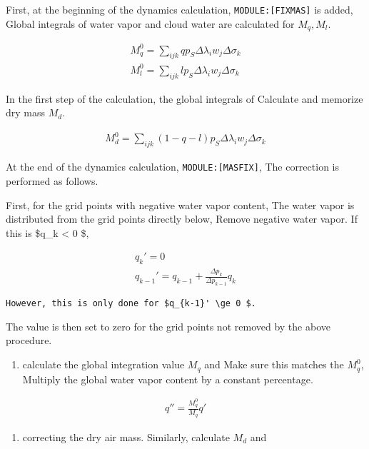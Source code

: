 First, at the beginning of the dynamics calculation,
\texttt{MODULE:{[}FIXMAS{]}} is added, Global integrals of water vapor
and cloud water are calculated for \(M_q, M_l\).

\begin{eqnarray}
  M_q^0  =  \sum_{ijk} q p_S  \Delta\lambda_i w_j \Delta\sigma_k  \\
  M_l^0  =  \sum_{ijk} l p_S  \Delta\lambda_i w_j \Delta\sigma_k 
\end{eqnarray}

In the first step of the calculation, the global integrals of Calculate
and memorize dry mass \(M_d\).

\begin{eqnarray}
  M_d^0 = \sum_{ijk} (1-q-l) p_S \Delta\lambda_i w_j \Delta\sigma_k 
\end{eqnarray}

At the end of the dynamics calculation, \texttt{MODULE:{[}MASFIX{]}},
The correction is performed as follows.

First, for the grid points with negative water vapor content, The water
vapor is distributed from the grid points directly below, Remove
negative water vapor. If this is \$q\_k \textless{} 0 \$,

\begin{eqnarray}
        q_k'      =  0          \\
        q_{k-1}'  =  q_{k-1} + \frac{\Delta p_k}{\Delta p_{k-1}} q_k
\end{eqnarray}

\begin{verbatim}
However, this is only done for $q_{k-1}' \ge 0 $.
\end{verbatim}

The value is then set to zero for the grid points not removed by the
above procedure.

\begin{enumerate}
\def\labelenumi{\arabic{enumi}.}
\setcounter{enumi}{2}
\tightlist
\item
  calculate the global integration value \(M_q\) and Make sure this
  matches the \(M_q^0\), Multiply the global water vapor content by a
  constant percentage.
\end{enumerate}

\begin{eqnarray}
        q'' = \frac{M_q^0}{M_q} q' 
\end{eqnarray}

\begin{enumerate}
\def\labelenumi{\arabic{enumi}.}
\setcounter{enumi}{3}
\tightlist
\item
  correcting the dry air mass. Similarly, calculate \(M_d\) and
\end{enumerate}

